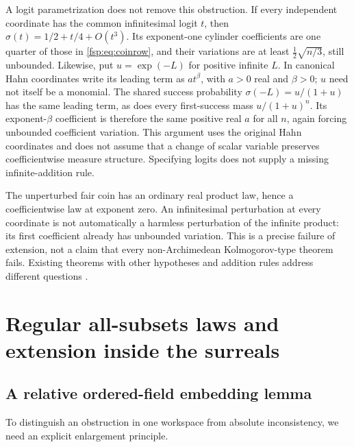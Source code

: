 \documentclass[11pt,a4paper]{article}
\numberwithin{equation}{section}
\theoremstyle{definition}
\theoremstyle{remark}
\begin{document}
A logit parametrization does not remove this obstruction. If every
independent coordinate has the common infinitesimal logit $t$, then
$\sigma(t)=1/2+t/4+O(t^3)$. Its exponent-one cylinder coefficients are
one quarter of those in \eqref{fsp:eq:coinrow}, and their variations
are at least $\tfrac12\sqrt{n/3}$, still unbounded.
Likewise, put $u=\exp(-L)$ for positive infinite $L$. In canonical
Hahn coordinates write its leading term as $a t^\beta$, with
$a>0$ real and $\beta>0$; $u$ need not itself be a monomial.
The shared success probability $\sigma(-L)=u/(1+u)$ has the same
leading term, as does every first-success mass
$u/(1+u)^n$. Its exponent-$\beta$ coefficient is therefore the same
positive real $a$ for all $n$, again forcing unbounded coefficient
variation. This argument uses the original Hahn coordinates and does
not assume that a change of scalar variable preserves coefficientwise
measure structure. Specifying logits does not supply a missing
infinite-addition rule.

The unperturbed fair coin has an ordinary real product law, hence a
coefficientwise law at exponent zero. An infinitesimal perturbation at
every coordinate is not automatically a harmless perturbation of the
infinite product: its first coefficient already has unbounded variation.
This is a precise failure of extension, not a claim that every
non-Archimedean Kolmogorov-type theorem fails. Existing theorems with
other hypotheses and addition rules address different questions
\cite{bhw,brickhill,repomeasures}.

\section{Regular all-subsets laws and extension inside the surreals}
\label{fsp:sec:extension}

\subsection{A relative ordered-field embedding lemma}

To distinguish an obstruction in one workspace from absolute
inconsistency, we need an explicit enlargement principle.
\end{document}
